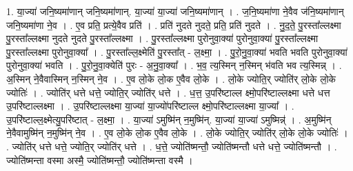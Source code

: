\documentclass[17pt]{extarticle}
\begin{document}
1. या॒ज्या॑ जनि॒ष्यमा॑णान् जनि॒ष्यमा॑णान्. या॒ज्या॑ या॒ज्या॑ जनि॒ष्यमा॑णान् । . ज॒नि॒ष्यमा॑णा ने॒वैव ज॑नि॒ष्यमा॑णान् जनि॒ष्यमा॑णा ने॒व । . ए॒व प्रति॒ प्रत्ये॒वैव प्रति॑ । . प्रति॑ नुदते नुदते॒ प्रति॒ प्रति॑ नुदते । . नु॒द॒ते॒ पु॒रस्ता᳚ल्लक्ष्मा पु॒रस्ता᳚ल्लक्ष्मा नुदते नुदते पु॒रस्ता᳚ल्लक्ष्मा । . पु॒रस्ता᳚ल्लक्ष्मा पुरोनुवा॒क्या॑ पुरोनुवा॒क्या॑ पु॒रस्ता᳚ल्लक्ष्मा पु॒रस्ता᳚ल्लक्ष्मा पुरोनुवा॒क्या᳚ । . पु॒रस्ता᳚ल्ल॒क्ष्मेति॑ पु॒रस्ता᳚त् - ल॒क्ष्मा॒ । . पु॒रो॒नु॒वा॒क्या॑ भवति भवति पुरोनुवा॒क्या॑ पुरोनुवा॒क्या॑ भवति । . पु॒रो॒नु॒वा॒क्येति॑ पुरः - अ॒नु॒वा॒क्या᳚ । . भ॒व॒ त्य॒स्मिन् न॒स्मिन् भ॑वति भव त्य॒स्मिन्न् । . अ॒स्मिन् ने॒वैवास्मिन् न॒स्मिन् ने॒व । . ए॒व लो॒के लो॒क ए॒वैव लो॒के । . लो॒के ज्योति॒र् ज्योति॑र् लो॒के लो॒के ज्योतिः॑ । . ज्योति॑र् धत्ते धत्ते॒ ज्योति॒र् ज्योति॑र् धत्ते । . ध॒त्त॒ उ॒परि॑ष्टाल्ल क्ष्मो॒परि॑ष्टाल्लक्ष्मा धत्ते धत्त उ॒परि॑ष्टाल्लक्ष्मा । . उ॒परि॑ष्टाल्लक्ष्मा या॒ज्या॑ या॒ज्यो॑परि॑ष्टाल्ल क्ष्मो॒परि॑ष्टाल्लक्ष्मा या॒ज्या᳚ । . उ॒परि॑ष्टाल्ल॒क्ष्मेत्यु॒परि॑ष्टात् - ल॒क्ष्मा॒ । . या॒ज्या॑ ऽमुष्मि॑न् न॒मुष्मि॑न्. या॒ज्या॑ या॒ज्या॑ ऽमुष्मिन्न्॑ । . अ॒मुष्मि॑न् ने॒वैवामुष्मि॑न् न॒मुष्मि॑न् ने॒व । . ए॒व लो॒के लो॒क ए॒वैव लो॒के । . लो॒के ज्योति॒र् ज्योति॑र् लो॒के लो॒के ज्योतिः॑ । . ज्योति॑र् धत्ते धत्ते॒ ज्योति॒र् ज्योति॑र् धत्ते । . ध॒त्ते॒ ज्योति॑ष्मन्तौ॒ ज्योति॑ष्मन्तौ धत्ते धत्ते॒ ज्योति॑ष्मन्तौ । . ज्योति॑ष्मन्ता वस्मा अस्मै॒ ज्योति॑ष्मन्तौ॒ ज्योति॑ष्मन्ता वस्मै । \newline
\end{document}

